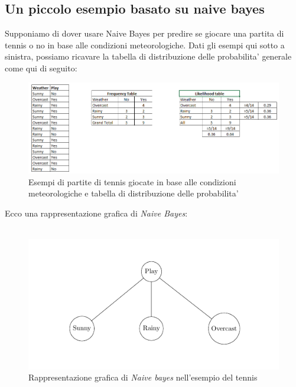\subsection{Un piccolo esempio basato su naive bayes}
Supponiamo di dover usare Naive Bayes per predire se giocare una partita di tennis o no in base alle condizioni meteorologiche. Dati gli esempi qui sotto a sinistra, possiamo ricavare la tabella di distribuzione delle probabilita' generale come qui di seguito:
\begin{figure}[H]
	\centering
	\includegraphics[width=1\linewidth]{img/Bayes_tennis_sample}
	\caption{Esempi di partite di tennis giocate in base alle condizioni meteorologiche e tabella di distribuzione delle probabilita'}
	\label{}
\end{figure}
\medskip
Ecco una rappresentazione grafica di \textit{Naive Bayes}:\\\\

\begin{figure}[H]
	\centering
	\includegraphics[width=0.7\linewidth]{img/graph_naive_bayes}
	\caption{Rappresentazione grafica di \textit{Naive bayes} nell'esempio del tennis}
	\label{fig:graphnaivebayes}
\end{figure}

